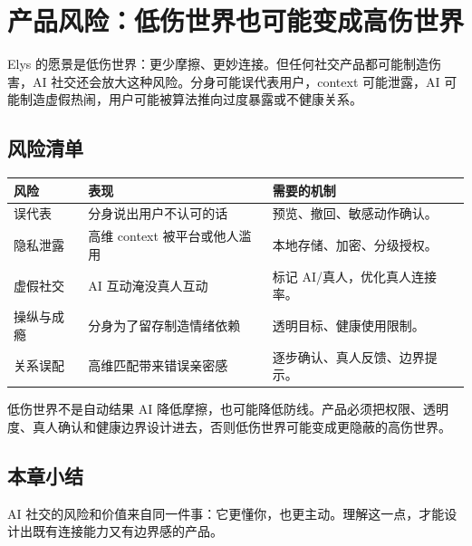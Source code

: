 \section{产品风险：低伤世界也可能变成高伤世界}

Elys 的愿景是低伤世界：更少摩擦、更妙连接。但任何社交产品都可能制造伤害，AI 社交还会放大这种风险。分身可能误代表用户，context 可能泄露，AI 可能制造虚假热闹，用户可能被算法推向过度暴露或不健康关系。

\subsection{风险清单}

\noindent\begin{tabularx}{\textwidth}{p{}p{}X}
\toprule
风险 & 表现 & 需要的机制 \\
\midrule
误代表 & 分身说出用户不认可的话 & 预览、撤回、敏感动作确认。 \\
隐私泄露 & 高维 context 被平台或他人滥用 & 本地存储、加密、分级授权。 \\
虚假社交 & AI 互动淹没真人互动 & 标记 AI/真人，优化真人连接率。 \\
操纵与成瘾 & 分身为了留存制造情绪依赖 & 透明目标、健康使用限制。 \\
关系误配 & 高维匹配带来错误亲密感 & 逐步确认、真人反馈、边界提示。 \\
\bottomrule
\end{tabularx}

\begin{warningbox}{低伤世界不是自动结果}
AI 降低摩擦，也可能降低防线。产品必须把权限、透明度、真人确认和健康边界设计进去，否则低伤世界可能变成更隐蔽的高伤世界。
\end{warningbox}

\subsection{本章小结}

AI 社交的风险和价值来自同一件事：它更懂你，也更主动。理解这一点，才能设计出既有连接能力又有边界感的产品。


